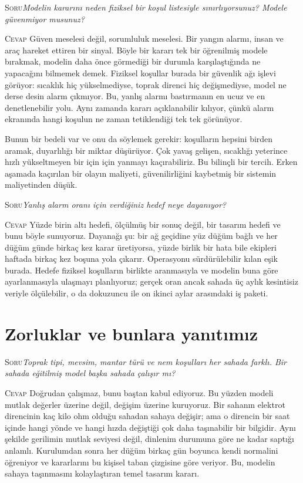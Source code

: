 \documentclass[11pt,a4paper]{article}
\newcommand{\soru}[1]{%
  \par\vskip 15pt plus 4pt minus 2pt
  \noindent\textcolor{ember}{\textsc{Soru}}\quad\emph{#1}%
  \par\vskip 6pt\noindent\textcolor{myco}{\textsc{Cevap}}\quad\ignorespaces}
\begin{document}
\soru{Modelin kararını neden fiziksel bir koşul listesiyle
sınırlıyorsunuz? Modele güvenmiyor musunuz?}
Güven meselesi değil, sorumluluk meselesi. Bir yangın alarmı, insan ve
araç hareket ettiren bir sinyal. Böyle bir kararı tek bir öğrenilmiş
modele bırakmak, modelin daha önce görmediği bir durumla karşılaştığında
ne yapacağını bilmemek demek. Fiziksel koşullar burada bir güvenlik ağı
işlevi görüyor: sıcaklık hiç yükselmediyse, toprak direnci hiç
değişmediyse, model ne derse desin alarm çıkmıyor. Bu, yanlış alarmı
bastırmanın en ucuz ve en denetlenebilir yolu. Aynı zamanda kararı
açıklanabilir kılıyor, çünkü alarm ekranında hangi koşulun ne zaman
tetiklendiği tek tek görünüyor.

Bunun bir bedeli var ve onu da söylemek gerekir: koşulların hepsini
birden aramak, duyarlılığı bir miktar düşürüyor. Çok yavaş gelişen,
sıcaklığı yeterince hızlı yükseltmeyen bir için için yanmayı
kaçırabiliriz. Bu bilinçli bir tercih. Erken aşamada kaçırılan bir
olayın maliyeti, güvenilirliğini kaybetmiş bir sistemin maliyetinden
düşük.

\soru{Yanlış alarm oranı için verdiğiniz hedef neye dayanıyor?}
Yüzde birin altı hedefi, ölçülmüş bir sonuç değil, bir tasarım hedefi
ve bunu böyle sunuyoruz. Dayanağı şu: bir ağ geçidine yüz düğüm bağlı
ve her düğüm günde birkaç kez karar üretiyorsa, yüzde birlik bir hata
bile ekipleri haftada birkaç kez boşuna yola çıkarır. Operasyonu
sürdürülebilir kılan eşik burada. Hedefe fiziksel koşulların birlikte
aranmasıyla ve modelin buna göre ayarlanmasıyla ulaşmayı planlıyoruz;
gerçek oran ancak sahada üç aylık kesintisiz veriyle ölçülebilir, o da
dokuzuncu ile on ikinci aylar arasındaki iş paketi.

\section*{Zorluklar ve bunlara yanıtımız}

\soru{Toprak tipi, mevsim, mantar türü ve nem koşulları her sahada
farklı. Bir sahada eğitilmiş model başka sahada çalışır mı?}
Doğrudan çalışmaz, bunu baştan kabul ediyoruz. Bu yüzden modeli mutlak
değerler üzerine değil, değişim üzerine kuruyoruz. Bir sahanın
elektrot direncinin kaç kilo ohm olduğu sahadan sahaya değişir; ama o
direncin bir saat içinde hangi yönde ve hangi hızda değiştiği çok daha
taşınabilir bir bilgidir. Aynı şekilde gerilimin mutlak seviyesi değil,
dinlenim durumuna göre ne kadar saptığı anlamlı. Kurulumdan sonra her
düğüm birkaç gün boyunca kendi normalini öğreniyor ve kararlarını bu
kişisel taban çizgisine göre veriyor. Bu, modelin sahaya taşınmasını
kolaylaştıran temel tasarım kararı.
\end{document}
